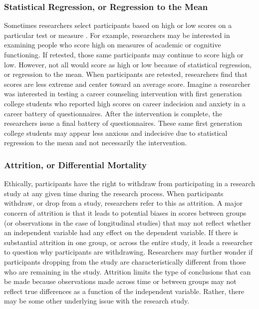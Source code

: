 \documentclass[
  11pt,
]{book}
\begin{document}
\subsubsection{Statistical Regression, or Regression to the Mean}\label{statistical-regression-or-regression-to-the-mean}

Sometimes researchers select participants based on high or low scores on a particular test or measure \citep{campbell_primer_1999}. For example, researchers may be interested in examining people who score high on measures of academic or cognitive functioning. If retested, those same participants may continue to score high or low. However, not all would score as high or low because of statistical regression, or regression to the mean. When participants are retested, researchers find that scores are less extreme and center toward an average score. Imagine a researcher was interested in testing a career counseling intervention with first generation college students who reported high scores on career indecision and anxiety in a career battery of questionnaires. After the intervention is complete, the researchers issue a final battery of questionnaires. These same first generation college students may appear less anxious and indecisive due to statistical regression to the mean and not necessarily the intervention.

\subsubsection{Attrition, or Differential Mortality}\label{attrition-or-differential-mortality}

Ethically, participants have the right to withdraw from participating in a research study at any given time during the research process. When participants withdraw, or drop from a study, researchers refer to this as attrition. A major concern of attrition is that it leads to potential biases in scores between groups (or observations in the case of longitudinal studies) that may not reflect whether an independent variable had any effect on the dependent variable. If there is substantial attrition in one group, or across the entire study, it leads a researcher to question why participants are withdrawing. Researchers may further wonder if participants dropping from the study are characteristically different from those who are remaining in the study. Attrition limits the type of conclusions that can be made because observations made across time or between groups may not reflect true differences as a function of the independent variable. Rather, there may be some other underlying issue with the research study.
\end{document}

